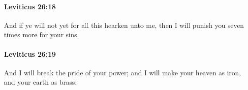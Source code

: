 		\paragraph{Leviticus 26:18} %
			\label{LEVITICUS-26-18}

			And if ye will not yet for all this hearken unto me, then I will punish you seven times more for your sins.


		\paragraph{Leviticus 26:19} %
			\label{LEVITICUS-26-19}

			And I will break the pride of your power; and I will make your heaven as iron, and your earth as brass:


